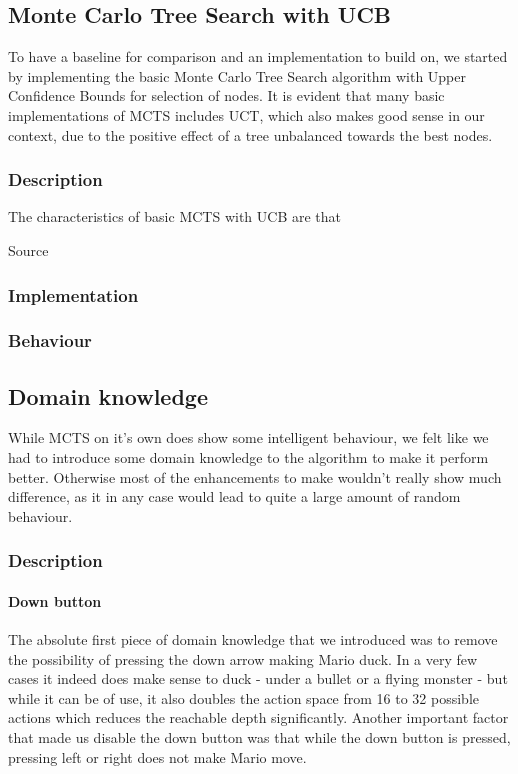 \documentclass[10pt,a4paper]{article}
\begin{document}
\subsection{Monte Carlo Tree Search with UCB}
To have a baseline for comparison and an implementation to build on, we started by implementing the basic Monte Carlo Tree Search algorithm with Upper Confidence Bounds for selection of nodes. It is evident that many basic implementations of MCTS includes UCT\cite{mspacman}, which also makes good sense in our context, due to the positive effect of a tree unbalanced towards the best nodes.

\subsubsection{Description}
The characteristics of basic MCTS with UCB are that 

Source \cite{mctssurvey}

\subsubsection{Implementation}

\subsubsection{Behaviour}

\subsection{Domain knowledge}
While MCTS on it's own does show some intelligent behaviour, we felt like we had to introduce some domain knowledge to the algorithm to make it perform better. Otherwise most of the enhancements to make wouldn't really show much difference, as it in any case would lead to quite a large amount of random behaviour.

\subsubsection{Description}
\paragraph{Down button}
The absolute first piece of domain knowledge that we introduced was to remove the possibility of pressing the down arrow making Mario duck. In a very few cases it indeed does make sense to duck - under a bullet or a flying monster - but while it can be of use, it also doubles the action space from 16 to 32 possible actions which reduces the reachable depth significantly.
Another important factor that made us disable the down button was that while the down button is pressed, pressing left or right does not make Mario move.
\end{document}
